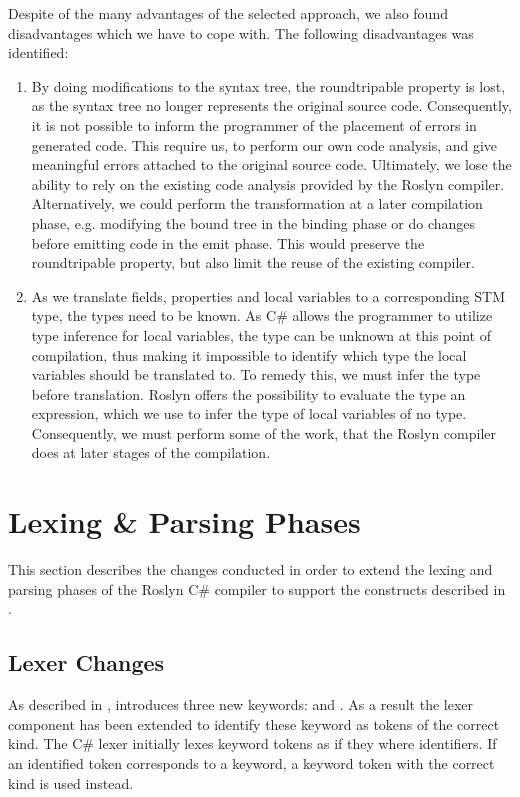Despite of the many advantages of the selected approach, we also found disadvantages which we have to cope with. The following disadvantages was identified:
\begin{enumerate}
	\item By doing modifications to the syntax tree, the roundtripable property is lost, as the syntax tree no longer represents the original source code. Consequently, it is not possible to inform the programmer of the placement of errors in generated code. This require us, to perform our own code analysis, and give meaningful errors attached to the original source code. Ultimately, we lose the ability to rely on the existing code analysis provided by the Roslyn compiler. Alternatively, we could perform the transformation at a later compilation phase, e.g. modifying the bound tree in the binding phase or do changes before emitting code in the emit phase. This would preserve the roundtripable property, but also limit the reuse of the existing compiler. 
	
	\item As we translate  fields, properties and local variables to a corresponding \ac{STM} type, the types need to be known. As C\# allows the programmer to utilize type inference for local variables, the type can be unknown at this point of compilation, thus making it impossible to identify which type the local variables should be translated to. To remedy this, we must infer the type before translation. Roslyn offers the possibility to evaluate the type an expression, which we use to infer the type of  local variables of no type. Consequently, we must perform some of the work, that the Roslyn compiler does at later stages of the compilation.
\end{enumerate}

\section{Lexing \& Parsing Phases}
This section describes the changes conducted in order to extend the lexing and parsing phases of the Roslyn C\# compiler to support the constructs described in .
\label{sec:roslyn_lexer_parser_changes}

\subsection{Lexer Changes}
As described in , \stmnamesp introduces three new keywords:   and . As a result the lexer component has been extended to identify these keyword as tokens of the correct kind. The C\# lexer initially lexes keyword tokens as if they where identifiers. If an identified token corresponds to a keyword, a keyword token with the correct kind is used instead. 

